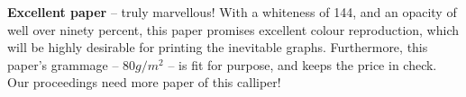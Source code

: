 \documentclass[12pt]{sigbovik-review}
\author{Reviewer Number Two-and-a-half}
\begin{document}
\maketitle

\textbf{Excellent paper} -- truly marvellous! With a whiteness of 144, and an opacity of well over ninety percent, this paper promises excellent colour reproduction, which will be highly desirable for printing the inevitable graphs. Furthermore, this paper's grammage -- 80$g/m^2$ -- is fit for purpose, and keeps the price in check. Our proceedings need more paper of this calliper!
\end{document}
